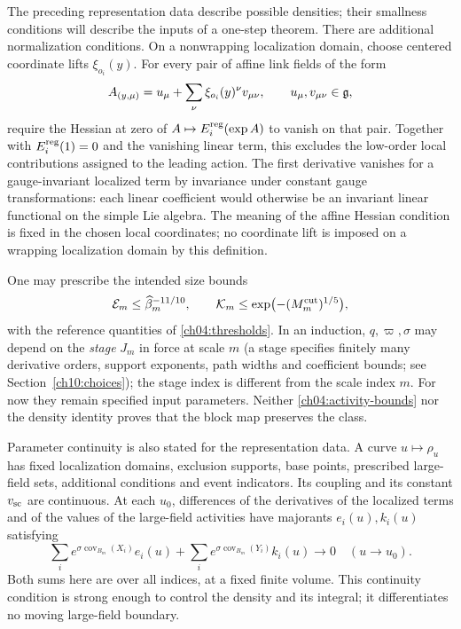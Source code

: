 The preceding representation data describe possible densities; their smallness
conditions will describe the inputs of a one-step theorem. There are
additional normalization conditions. On a nonwrapping localization domain, choose
centered coordinate lifts $\xi_{o_i}(y)$. For every pair of affine link
fields of the form
\[
 A_{(y,\mu)}=u_\mu+\sum_\nu\xi_{o_i}(y)^\nu v_{\mu\nu},
 \qquad u_\mu,v_{\mu\nu}\in\mathfrak g,
\]
require the Hessian at zero of $A\mapsto E_i^{\rm reg}(\exp A)$ to vanish
on that pair. Together with $E_i^{\rm reg}(1)=0$ and the vanishing linear
term, this excludes the low-order local contributions assigned to the
leading action. The first derivative vanishes for a gauge-invariant localized
term by invariance under constant gauge transformations: each
linear coefficient would otherwise be an invariant linear functional on
the simple Lie algebra. The meaning of the affine Hessian condition is
fixed in the chosen local coordinates; no coordinate lift is imposed on
a wrapping localization domain by this definition.

One may prescribe the intended size bounds
\begin{equation}
 \mathcal E_m\le\widehat\beta_m^{-11/10},\qquad
 \mathcal K_m\le\exp\bigl(-(M_m^{\rm cut})^{1/5}\bigr),
 \label{ch04:activity-bounds}
\end{equation}
with the reference quantities of \eqref{ch04:thresholds}. In an induction,
$q,\varpi,\sigma$ may depend on the \emph{stage} $J_m$ in force at scale $m$ (a stage specifies finitely many derivative orders, support exponents, path widths and coefficient bounds; see Section~\ref{ch10:choices}); the stage index
is different from the scale index $m$. For now they remain specified input
parameters. Neither \eqref{ch04:activity-bounds} nor the density identity
proves that the block map preserves the class.

Parameter continuity is also stated for the representation data. A curve
$u\mapsto\rho_u$ has fixed localization domains, exclusion supports, base points, prescribed large-field sets,
additional conditions and event indicators. Its coupling and its constant $v_{\rm sc}$ are continuous. At each
$u_0$, differences of the derivatives of the localized terms and of the values of the large-field activities have
majorants $e_i(u),k_i(u)$ satisfying
\[
 \sum_i e^{\sigma\operatorname{cov}_{B_m}(X_i)}e_i(u)
 +\sum_i e^{\sigma\operatorname{cov}_{B_m}(Y_i)}k_i(u)
                  \longrightarrow0\quad(u\to u_0).
\]
Both sums here are over all indices, at a fixed finite volume. This
continuity condition is strong enough to control the density and its
integral; it differentiates no moving large-field boundary.

